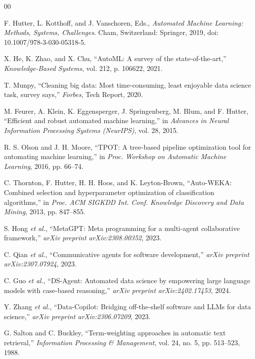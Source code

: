 \documentclass[conference]{IEEEtran}
\begin{document}
\begin{thebibliography}{00}

F. Hutter, L. Kotthoff, and J. Vanschoren, Eds., \emph{Automated Machine Learning: Methods, Systems, Challenges}. Cham, Switzerland: Springer, 2019, doi: 10.1007/978-3-030-05318-5.

X. He, K. Zhao, and X. Chu, ``AutoML: A survey of the state-of-the-art,'' \emph{Knowledge-Based Systems}, vol. 212, p. 106622, 2021.

T. Munpy, ``Cleaning big data: Most time-consuming, least enjoyable data science task, survey says,'' \emph{Forbes}, Tech Report, 2020.

M. Feurer, A. Klein, K. Eggensperger, J. Springenberg, M. Blum, and F. Hutter, ``Efficient and robust automated machine learning,'' in \emph{Advances in Neural Information Processing Systems (NeurIPS)}, vol. 28, 2015.

R. S. Olson and J. H. Moore, ``TPOT: A tree-based pipeline optimization tool for automating machine learning,'' in \emph{Proc. Workshop on Automatic Machine Learning}, 2016, pp. 66--74.

C. Thornton, F. Hutter, H. H. Hoos, and K. Leyton-Brown, ``Auto-WEKA: Combined selection and hyperparameter optimization of classification algorithms,'' in \emph{Proc. ACM SIGKDD Int. Conf. Knowledge Discovery and Data Mining}, 2013, pp. 847--855.

S. Hong \emph{et al.}, ``MetaGPT: Meta programming for a multi-agent collaborative framework,'' \emph{arXiv preprint arXiv:2308.00352}, 2023.

C. Qian \emph{et al.}, ``Communicative agents for software development,'' \emph{arXiv preprint arXiv:2307.07924}, 2023.

C. Guo \emph{et al.}, ``DS-Agent: Automated data science by empowering large language models with case-based reasoning,'' \emph{arXiv preprint arXiv:2402.17453}, 2024.

Y. Zhang \emph{et al.}, ``Data-Copilot: Bridging off-the-shelf software and LLMs for data science,'' \emph{arXiv preprint arXiv:2306.07209}, 2023.

G. Salton and C. Buckley, ``Term-weighting approaches in automatic text retrieval,'' \emph{Information Processing \& Management}, vol. 24, no. 5, pp. 513--523, 1988.


\end{thebibliography}
\end{document}
